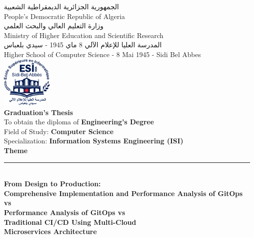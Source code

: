 \thispagestyle{empty}

\begin{center}

{\footnotesize \textarabic{الجمهورية الجزائرية الديمقراطية الشعبية}} \\[0.05cm]
{\footnotesize People's Democratic Republic of Algeria} \\[0.1cm]

{\footnotesize \textarabic{وزارة التعليم العالي والبحث العلمي}} \\[0.05cm]
{\footnotesize Ministry of Higher Education and Scientific Research} \\[0.1cm]

{\footnotesize \textarabic{المدرسة العليا للإعلام الآلي 8 ماي 1945 - سيدي بلعباس}} \\[0.05cm]
{\footnotesize Higher School of Computer Science - 8 Mai 1945 - Sidi Bel Abbes} \\[0.2cm]

\includegraphics[width=2.5cm]{figures/logos/esi-sba-logo.png} \\[0.15cm]

{\Large \textbf{Graduation's Thesis}} \\[0.3cm]

{\small To obtain the diploma of \textbf{Engineering's Degree}} \\[0.1cm]
{\small Field of Study: \textbf{Computer Science}} \\[0.1cm]
{\small Specialization: \textbf{Information Systems Engineering (ISI)}} \\[0.4cm]

{\large \textbf{Theme}} \\[0.2cm]
\rule{13cm}{0.5pt} \\[0.3cm]

{\LARGE \textbf{From Design to Production:}} \\[0.3cm]
{\LARGE \textbf{Comprehensive Implementation and Performance Analysis of GitOps vs}} \\[0.3cm]
{\LARGE \textbf{Performance Analysis of GitOps vs}} \\[0.3cm]
{\LARGE \textbf{Traditional CI/CD Using Multi-Cloud}} \\[0.3cm]
{\LARGE \textbf{Microservices Architecture}} \\[0.5cm]


\end{center}
